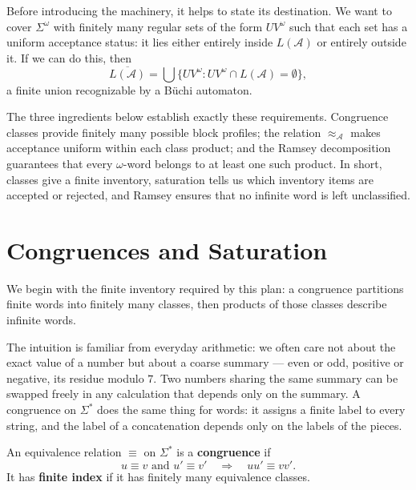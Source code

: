 Before introducing the machinery, it helps to state its destination.
We want to cover $\Sigma^\omega$ with finitely many regular sets of the
form $UV^\omega$ such that each set has a uniform acceptance status: it
lies either entirely inside $L(\mathcal A)$ or entirely outside it.  If
we can do this, then
\[
  \overline{L(\mathcal A)}
  =
  \bigcup
  \{UV^\omega : UV^\omega\cap L(\mathcal A)=\emptyset\},
\]
a finite union recognizable by a B\"uchi automaton.

The three ingredients below establish exactly these requirements.
Congruence classes provide finitely many possible block profiles; the
relation $\approx_{\mathcal A}$ makes acceptance uniform within each
class product; and the Ramsey decomposition guarantees that every
$\omega$-word belongs to at least one such product.  In short, classes
give a finite inventory, saturation tells us which inventory items are
accepted or rejected, and Ramsey ensures that no infinite word is left
unclassified.


\section{Congruences and Saturation}
\label{sec:congruence-saturation}

We begin with the finite inventory required by this plan: a congruence
partitions finite words into finitely many classes, then products of
those classes describe infinite words.

The intuition is familiar from everyday arithmetic: we often care not
about the exact value of a number but about a coarse summary --- even or
odd, positive or negative, its residue modulo $7$.  Two numbers sharing
the same summary can be swapped freely in any calculation that depends
only on the summary.  A congruence on $\Sigma^*$ does the same thing
for words: it assigns a finite label to every string, and the label of a
concatenation depends only on the labels of the pieces.

\begin{definition}[Congruence]
\label{def:congruence}
An equivalence relation $\equiv$ on $\Sigma^*$ is a
\textbf{congruence} if
\[
  u\equiv v \text{ and } u'\equiv v'
  \quad\Longrightarrow\quad
  uu'\equiv vv'.
\]
It has \textbf{finite index} if it has finitely many equivalence classes.
\end{definition}

